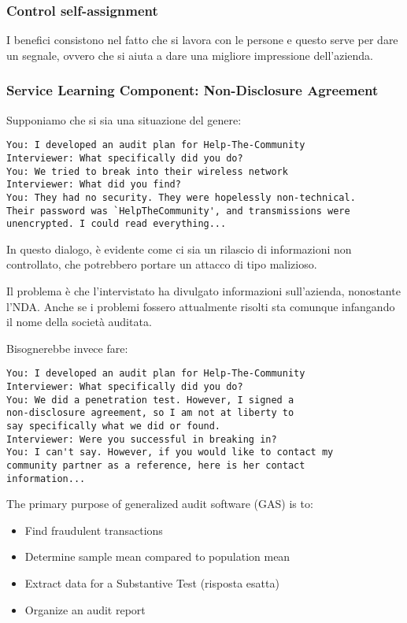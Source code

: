 \subsubsection{Control self-assignment}
I benefici consistono nel fatto che si lavora con le persone e questo serve per dare un segnale, ovvero che si aiuta a dare una migliore impressione dell'azienda.



\subsubsection{Service Learning Component: Non-Disclosure Agreement}

Supponiamo che si sia una situazione del genere:

\begin{verbatim}
You: I developed an audit plan for Help-The-Community
Interviewer: What specifically did you do?
You: We tried to break into their wireless network
Interviewer: What did you find?
You: They had no security. They were hopelessly non-technical.
Their password was `HelpTheCommunity', and transmissions were
unencrypted. I could read everything...
\end{verbatim}

In questo dialogo, è evidente come ci sia un rilascio di informazioni non controllato, che potrebbero portare un attacco di tipo malizioso.





Il problema è che l'intervistato ha divulgato informazioni sull'azienda, nonostante l'NDA. Anche se i problemi fossero attualmente risolti sta comunque infangando il nome della società auditata.


Bisognerebbe invece fare:
\begin{verbatim}
You: I developed an audit plan for Help-The-Community
Interviewer: What specifically did you do?
You: We did a penetration test. However, I signed a
non-disclosure agreement, so I am not at liberty to
say specifically what we did or found.
Interviewer: Were you successful in breaking in?
You: I can't say. However, if you would like to contact my
community partner as a reference, here is her contact
information...
\end{verbatim}




The primary purpose of generalized audit software (GAS) is to:
\begin{itemize}
\item Find fraudulent transactions
\item Determine sample mean compared to population mean
\item Extract data for a Substantive Test (risposta esatta)
\item Organize an audit report
\end{itemize}


